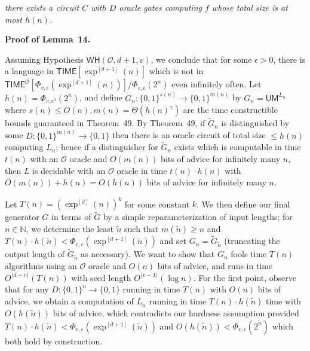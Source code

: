 \emph{there exists a circuit $C$ with $D$ oracle gates computing $f$ whose total size is at most $h(n)$.}\par






\par\medskip\noindent\textbf{Proof of Lemma 14.}\par




Assuming Hypothesis $\mathsf{WH}(\mathcal{O},d+1,v)$, we conclude that for some $\epsilon>0$, there is a language in ${\mathsf{TIME}}[\exp^{[d+1]}(n)]$ which is not in ${\mathsf{TIME}}^{\mathcal{O}}[\Phi_{v,\epsilon}(\exp^{[d+1]}(n))]/\Phi_{v,\epsilon}(2^{n})$ even infinitely often. Let $h(n)=\Phi_{v,\epsilon^{2}}(2^{n})$, and define $\tilde{G}_{n}:\{0,1\}^{s(n)}\to\{0,1\}^{m(n)}$ by $G_{n}=\mathsf{UM}^{L_{n}}$ where $s(n)\leq O(n),m(n)=\Theta(h(n)^{\gamma})$ are the time constructible bounds guaranteed in Theorem 49. By Theorem 49, if $\tilde{G}_{n}$ is distinguished by some $D:\{0,1\}^{m(n)}\to\{0,1\}$ then there is an oracle circuit of total size $\leq h(n)$ computing $L_{n}$; hence if a distinguisher for $\tilde{G}_{n}$ exists which is computable in time $t(n)$ with an $\mathcal{O}$ oracle and $O(m(n))$ bits of advice for infinitely many $n$, then $L$ is decidable with an $\mathcal{O}$ oracle in time $t(n)\cdot h(n)$ with $O(m(n))+h(n)=O(h(n))$ bits of advice for infinitely many $n$.\par




Let $T(n)=(\exp^{[d]}(n))^{k}$ for some constant $k$. We then define our final generator $G$ in terms of $\tilde{G}$ by a simple reparameterization of input lengths; for $n\in\mathbb{N}$, we determine the least $\tilde{n}$ such that $m(\tilde{n})\geq n$ and $T(n)\cdot h(\tilde{n})<\Phi_{v,\epsilon}(\exp^{[d+1]}(\tilde{n}))$
and set $G_{n}=\tilde{G}_{\tilde{n}}$ (truncating the output length of $\tilde{G}_{\tilde{n}}$ as necessary).
We want to show that $G_{n}$ fools time $T(n)$ algorithms using an $\mathcal{O}$ oracle and $O(n)$ bits of advice, and runs in time $O^{\langle d+v\rangle}(T(n))$ with seed length $O^{\langle v-1\rangle}(\log n)$. For the first point, observe that for any $D:\{0,1\}^{n}\to\{0,1\}$ running in time $T(n)$ with $O(n)$ bits of advice, we obtain a computation of $L_{\tilde{n}}$ running in time $T(n)\cdot h(\tilde{n})$ time with $O(h(\tilde{n}))$ bits of advice, which contradicts our hardness assumption provided $T(n)\cdot h(\tilde{n})<\Phi_{v,\epsilon}(\exp^{[d+1]}(\tilde{n}))$ and $O(h(\tilde{n}))<\Phi_{v,\epsilon}(2^{\tilde{n}})$ which both hold by construction.\par





